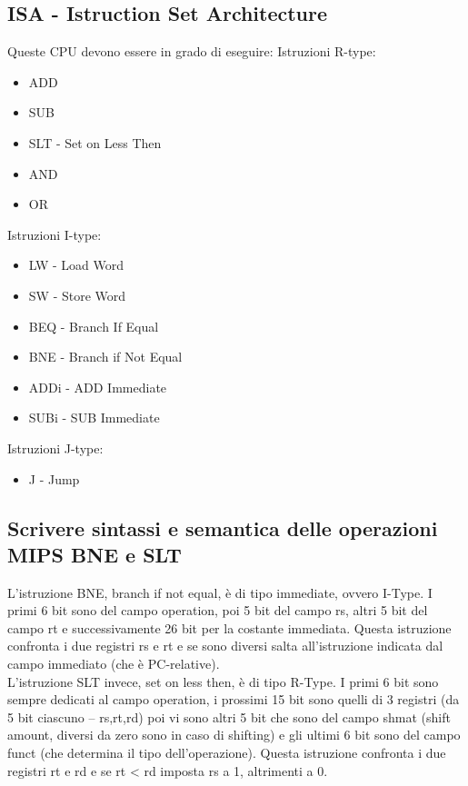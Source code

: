 \documentclass[italian]{article}
\begin{document}
		\subsection{ISA - Istruction Set Architecture}
		Queste CPU devono essere in grado di eseguire:
		Istruzioni R-type:
		\begin{itemize}[noitemsep]
			\item ADD
			\item SUB \\
			\item SLT  - Set on Less Then\\
			\item AND
			\item OR
		\end{itemize}
		Istruzioni I-type:
		\begin{itemize}[noitemsep]
			\item LW - Load Word
			\item SW - Store Word
			\item BEQ - Branch If Equal
			\item BNE - Branch if Not Equal
			\item ADDi - ADD Immediate
			\item SUBi - SUB Immediate
		\end{itemize}
		Istruzioni J-type:
		\begin{itemize}[noitemsep]
			\item J - Jump
		\end{itemize}
	
	\subsection{Scrivere sintassi e semantica delle operazioni MIPS BNE e SLT}
	L’istruzione BNE, branch if not equal, è di tipo immediate, ovvero I-Type. I primi 6 bit sono del campo operation, poi 5 bit del campo rs, altri 5 bit del campo rt e successivamente 26 bit per la costante immediata. Questa istruzione confronta i due registri rs e rt e se sono diversi salta all’istruzione indicata dal campo immediato (che è PC-relative). \\[2mm]
	L’istruzione SLT invece, set on less then, è di tipo R-Type. I primi 6 bit sono sempre dedicati al campo operation, i prossimi 15 bit sono quelli di 3 registri (da 5 bit ciascuno – rs,rt,rd) poi vi sono altri 5 bit che sono del campo shmat (shift amount, diversi da zero sono in caso di shifting) e gli ultimi 6 bit sono del campo funct (che determina il tipo dell’operazione). Questa istruzione confronta i due registri rt e rd e se rt < rd imposta rs a 1, altrimenti a 0.
	
\end{document}
